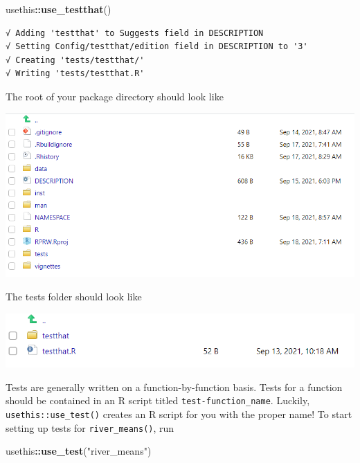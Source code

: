 \documentclass[
]{book}
\newenvironment{Shaded}{\begin{snugshade}}{\end{snugshade}}
\newcommand{\KeywordTok}[1]{\textcolor[rgb]{0.13,0.29,0.53}{\textbf{#1}}}
\newcommand{\NormalTok}[1]{#1}
\newcommand{\OperatorTok}[1]{\textcolor[rgb]{0.81,0.36,0.00}{\textbf{#1}}}
\newcommand{\StringTok}[1]{\textcolor[rgb]{0.31,0.60,0.02}{#1}}
\begin{document}
\begin{Shaded}
\begin{Highlighting}[]
\NormalTok{usethis}\OperatorTok{::}\KeywordTok{use_testthat}\NormalTok{()}
\end{Highlighting}
\end{Shaded}

\begin{verbatim}
√ Adding 'testthat' to Suggests field in DESCRIPTION
√ Setting Config/testthat/edition field in DESCRIPTION to '3'
√ Creating 'tests/testthat/'
√ Writing 'tests/testthat.R'
\end{verbatim}

The root of your package directory should look like

\includegraphics[width=1\linewidth]{images/newrpack_files3}

The tests folder should look like

\includegraphics[width=1\linewidth]{images/newrpack_files4}

Tests are generally written on a function-by-function basis. Tests for a function should be contained in an R script titled \texttt{test-function\_name}. Luckily, \texttt{usethis::use\_test()} creates an R script for you with the proper name! To start setting up tests for \texttt{river\_means()}, run

\begin{Shaded}
\begin{Highlighting}[]
\NormalTok{usethis}\OperatorTok{::}\KeywordTok{use_test}\NormalTok{(}\StringTok{"river_means"}\NormalTok{)}
\end{Highlighting}
\end{Shaded}
\end{document}
